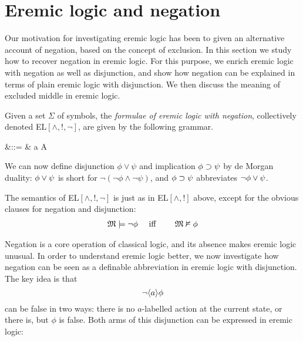 \section{Eremic logic and negation}

Our motivation for investigating eremic logic has been to given an
alternative account of negation, based on the concept of exclusion.
In this section we study how to recover negation in eremic logic. For
this purpose, we enrich eremic logic with negation as well as
disjunction, and show how negation can be explained in terms of plain
eremic logic with disjunction. We then discuss the meaning of excluded
middle in eremic logic.

\begin{definition}
Given a set $\Sigma$ of symbols, the \emph{formulae of eremic logic
  with negation}, collectively denoted EL$[\land, !, \neg]$, are given
by the following grammar.

\begin{GRAMMAR}
  \phi 
     &\quad ::= \quad & 
   \top \fOr \bot \fOr \neg \phi \fOr \phi \land \psi \fOr \langle a \rangle \phi \fOr \fBang A 
\end{GRAMMAR}

\NI We can now define disjunction $\phi \lor \psi$ and implication
$\phi \supset \psi$ by de Morgan duality: $\phi \lor \psi$ is short
for $\neg (\neg \phi \land \neg \psi )$, and $\phi \supset \psi$  abbreviates
$\neg\phi \lor \psi$.
\end{definition}

The semantics of EL$[\land, !, \neg]$ is just as in EL$[\land, !]$
above, except for the obvious clauses for negation and disjunction:
\begin{eqnarray*}
\frak{M} \models \neg \phi &\quad\mbox{ iff }\quad& \frak{M} \nvDash \phi  
\end{eqnarray*}


Negation is a core operation of classical logic, and its absence makes
eremic logic unusual. In order to understand eremic logic better, we
now investigate how negation can be seen as a definable abbreviation
in eremic logic with disjunction. The key idea is that 
\[
   \neg \langle a \rangle \phi
\]
can be false in two ways: there is no $a$-labelled action at the
current state, or there is, but $\phi$ is false. Both arms of this
disjunction can be expressed in eremic logic:

